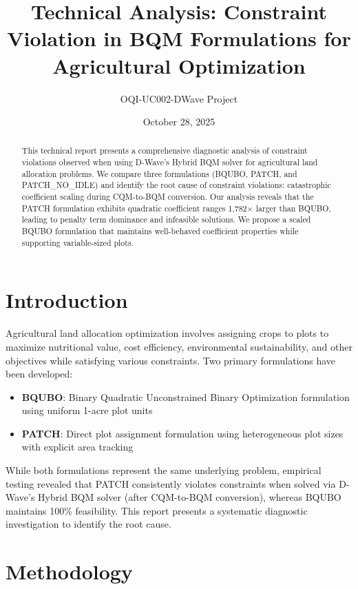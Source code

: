 \documentclass[11pt,a4paper]{article}
\title{Technical Analysis: Constraint Violation in BQM Formulations for Agricultural Optimization}
\author{OQI-UC002-DWave Project}
\date{October 28, 2025}
\begin{document}
\maketitle

\begin{abstract}
This technical report presents a comprehensive diagnostic analysis of constraint violations observed when using D-Wave's Hybrid BQM solver for agricultural land allocation problems. We compare three formulations (BQUBO, PATCH, and PATCH\_NO\_IDLE) and identify the root cause of constraint violations: catastrophic coefficient scaling during CQM-to-BQM conversion. Our analysis reveals that the PATCH formulation exhibits quadratic coefficient ranges 1,782× larger than BQUBO, leading to penalty term dominance and infeasible solutions. We propose a scaled BQUBO formulation that maintains well-behaved coefficient properties while supporting variable-sized plots.
\end{abstract}

\section{Introduction}

Agricultural land allocation optimization involves assigning crops to plots to maximize nutritional value, cost efficiency, environmental sustainability, and other objectives while satisfying various constraints. Two primary formulations have been developed:

\begin{itemize}
    \item \textbf{BQUBO}: Binary Quadratic Unconstrained Binary Optimization formulation using uniform 1-acre plot units
    \item \textbf{PATCH}: Direct plot assignment formulation using heterogeneous plot sizes with explicit area tracking
\end{itemize}

While both formulations represent the same underlying problem, empirical testing revealed that PATCH consistently violates constraints when solved via D-Wave's Hybrid BQM solver (after CQM-to-BQM conversion), whereas BQUBO maintains 100\% feasibility. This report presents a systematic diagnostic investigation to identify the root cause.

\section{Methodology}
\end{document}
